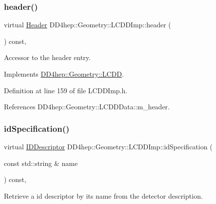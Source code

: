 \subsubsection{\texorpdfstring{header()}{header()}}
{\footnotesize\ttfamily virtual \hyperlink{class_d_d4hep_1_1_geometry_1_1_header}{Header} D\+D4hep\+::\+Geometry\+::\+L\+C\+D\+D\+Imp\+::header (\begin{DoxyParamCaption}{ }\end{DoxyParamCaption}) const\hspace{0.3cm}{\ttfamily [inline]}, {\ttfamily [virtual]}}



Accessor to the header entry. 



Implements \hyperlink{class_d_d4hep_1_1_geometry_1_1_l_c_d_d_ad09f49fc86a5b286ae55901e2b169d7c}{D\+D4hep\+::\+Geometry\+::\+L\+C\+DD}.



Definition at line 159 of file L\+C\+D\+D\+Imp.\+h.



References D\+D4hep\+::\+Geometry\+::\+L\+C\+D\+D\+Data\+::m\+\_\+header.

\hypertarget{class_d_d4hep_1_1_geometry_1_1_l_c_d_d_imp_ac1c41466210f2580c625260ea424b1b4}{}\label{class_d_d4hep_1_1_geometry_1_1_l_c_d_d_imp_ac1c41466210f2580c625260ea424b1b4} 
\subsubsection{\texorpdfstring{id\+Specification()}{idSpecification()}}
{\footnotesize\ttfamily virtual \hyperlink{class_d_d4hep_1_1_geometry_1_1_i_d_descriptor}{I\+D\+Descriptor} D\+D4hep\+::\+Geometry\+::\+L\+C\+D\+D\+Imp\+::id\+Specification (\begin{DoxyParamCaption}\item[{const std\+::string \&}]{name }\end{DoxyParamCaption}) const\hspace{0.3cm}{\ttfamily [inline]}, {\ttfamily [virtual]}}



Retrieve a id descriptor by it\textquotesingle{}s name from the detector description. 



